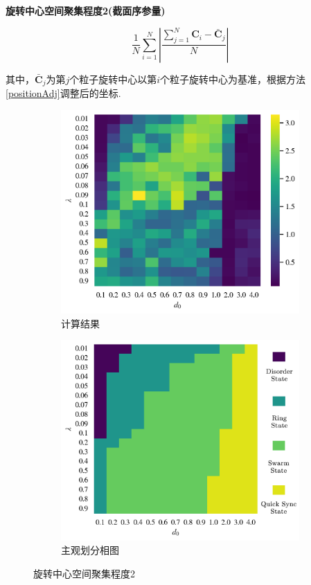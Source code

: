 \documentclass{article}
\begin{document}
\noindent\textbf{旋转中心空间聚集程度2(截面序参量)}

$$
\frac{1}{N}\sum_{i=1}^N{\left| \frac{\sum\nolimits_{j=1}^N{\mathbf{C}_i-\bar{\mathbf{C}}_j}}{N} \right|}
$$

其中，$\bar{\mathbf{C}}_j$为第$j$个粒子旋转中心以第$i$个粒子旋转中心为基准，根据方法\ref{positionAdj}调整后的坐标.

\begin{figure}[H]
	\centering
	\begin{subfigure}[b]{0.49\textwidth}
		\includegraphics[width=\textwidth]{./figs/centerAggOp2.png}
		\vspace{-1cm}
		\caption{计算结果}
	\end{subfigure}
	\begin{subfigure}[b]{0.49\textwidth}
		\includegraphics[width=\textwidth]{./figs/subjectiveOp.png}
		\vspace{-1cm}
		\caption{主观划分相图}
	\end{subfigure}
	\vspace{-0.5cm}
	\caption{旋转中心空间聚集程度2}
	\label{fig:fig234c.4}
\end{figure}
\end{document}
